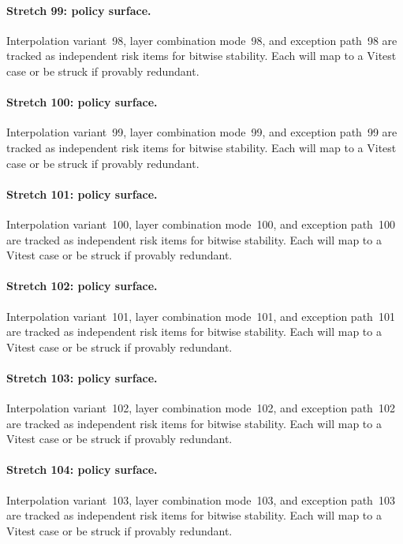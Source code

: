 \documentclass[sigconf,nonacm]{acmart}
\begin{document}
\paragraph{Stretch 99: policy surface.}
Interpolation variant~98, layer combination mode~98, and exception path~98 are tracked as independent risk items for bitwise stability. Each will map to a Vitest case or be struck if provably redundant. %

\paragraph{Stretch 100: policy surface.}
Interpolation variant~99, layer combination mode~99, and exception path~99 are tracked as independent risk items for bitwise stability. Each will map to a Vitest case or be struck if provably redundant. %

\paragraph{Stretch 101: policy surface.}
Interpolation variant~100, layer combination mode~100, and exception path~100 are tracked as independent risk items for bitwise stability. Each will map to a Vitest case or be struck if provably redundant. %

\paragraph{Stretch 102: policy surface.}
Interpolation variant~101, layer combination mode~101, and exception path~101 are tracked as independent risk items for bitwise stability. Each will map to a Vitest case or be struck if provably redundant. %

\paragraph{Stretch 103: policy surface.}
Interpolation variant~102, layer combination mode~102, and exception path~102 are tracked as independent risk items for bitwise stability. Each will map to a Vitest case or be struck if provably redundant. %

\paragraph{Stretch 104: policy surface.}
Interpolation variant~103, layer combination mode~103, and exception path~103 are tracked as independent risk items for bitwise stability. Each will map to a Vitest case or be struck if provably redundant. %
\end{document}
